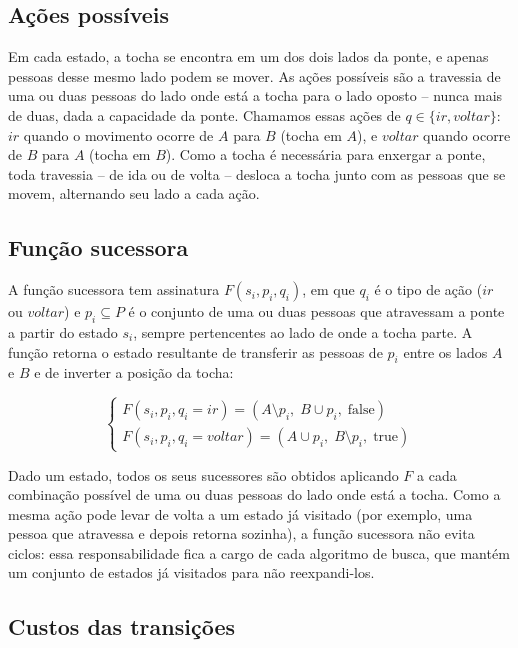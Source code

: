 \subsection{Ações possíveis}

Em cada estado, a tocha se encontra em um dos dois lados da ponte, e apenas
pessoas desse mesmo lado podem se mover. As ações possíveis são a travessia de
uma ou duas pessoas do lado onde está a tocha para o lado oposto -- nunca mais
de duas, dada a capacidade da ponte. Chamamos essas ações de
$q \in \{\mathit{ir}, \mathit{voltar}\}$: $\mathit{ir}$ quando o movimento
ocorre de $A$ para $B$ (tocha em $A$), e $\mathit{voltar}$ quando ocorre de
$B$ para $A$ (tocha em $B$). Como a tocha é necessária para enxergar a ponte,
toda travessia -- de ida ou de volta -- desloca a tocha junto com as pessoas
que se movem, alternando seu lado a cada ação.

\subsection{Função sucessora}

A função sucessora tem assinatura $F(s_i, p_i, q_i)$, em que $q_i$ é o tipo de
ação ($\mathit{ir}$ ou $\mathit{voltar}$) e $p_i \subseteq P$ é o conjunto de
uma ou duas pessoas que atravessam a ponte a partir do estado $s_i$, sempre
pertencentes ao lado de onde a tocha parte. A função retorna o estado
resultante de transferir as pessoas de $p_i$ entre os lados $A$ e $B$ e de
inverter a posição da tocha:

\begin{equation}
	\begin{cases}
		F(s_i, p_i, q_i=\mathit{ir}) = (A \setminus p_i,\; B \cup p_i,\; \text{false})
		\\
		F(s_i, p_i, q_i=\mathit{voltar}) = (A \cup p_i,\; B \setminus p_i,\; \text{true})
	\end{cases}
\end{equation}

Dado um estado, todos os seus sucessores são obtidos aplicando $F$ a cada
combinação possível de uma ou duas pessoas do lado onde está a tocha. Como a
mesma ação pode levar de volta a um estado já visitado (por exemplo, uma
pessoa que atravessa e depois retorna sozinha), a função sucessora não evita
ciclos: essa responsabilidade fica a cargo de cada algoritmo de busca, que
mantém um conjunto de estados já visitados para não reexpandi-los.

\subsection{Custos das transições}

